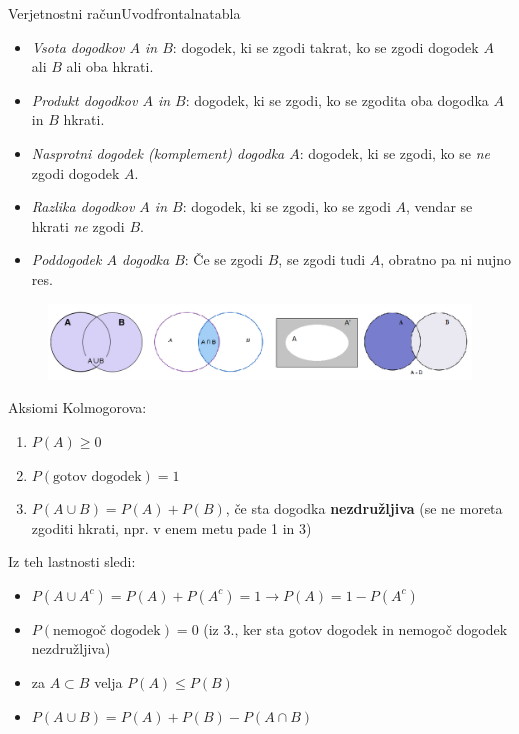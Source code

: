 \begin{priprava}{}{}{Verjetnostni račun}{Uvod}{frontalna}{tabla}
\begin{itemize}
    \item \emph{Vsota dogodkov $ A $ in $ B $}: dogodek, ki se zgodi takrat, ko se zgodi dogodek $ A $ ali $ B $ ali oba hkrati. 
    \item \emph{Produkt dogodkov $ A $ in $ B $}: dogodek, ki se zgodi, ko se zgodita oba dogodka $ A $ in $ B $ hkrati. 
    \item \emph{Nasprotni dogodek (komplement) dogodka $ A $}: dogodek, ki se zgodi, ko se \emph{ne} zgodi dogodek $ A $. 
    \item \emph{Razlika dogodkov $ A $ in $ B $}: dogodek, ki se zgodi, ko se zgodi $ A $, vendar se hkrati \emph{ne} zgodi $ B $. 
    \item \emph{Poddogodek $ A $ dogodka $ B $}: Če se zgodi $ B $, se zgodi tudi $ A $, obratno pa ni nujno res. 
\end{itemize}

\newpage

\begin{figure}[h]
    \centering
    \includegraphics[width=\textwidth]{slike/dogodki.png}
\end{figure}

Aksiomi Kolmogorova: 
\begin{enumerate}
    \item $ P(A) \geq 0 $
    \item $ P(\text{gotov dogodek}) = 1 $
    \item $ P(A \cup B) = P(A) + P(B) $, če sta dogodka \textbf{nezdružljiva} (se ne moreta zgoditi hkrati, npr. v enem metu pade 1 in 3)
\end{enumerate}
Iz teh lastnosti sledi: 
\begin{itemize}
    \item $ P(A \cup A^c) = P(A) + P(A^c) = 1 \rightarrow P(A) = 1 - P(A^c) $
    \item $ P(\text{nemogoč dogodek}) = 0 $ (iz 3., ker sta gotov dogodek in nemogoč dogodek nezdružljiva)
    \item za $ A \subset B $ velja $ P(A) \leq P(B) $ 
    \item $ P(A \cup B) = P(A) + P(B) - P(A \cap B) $ 
\end{itemize}
    

\end{priprava}